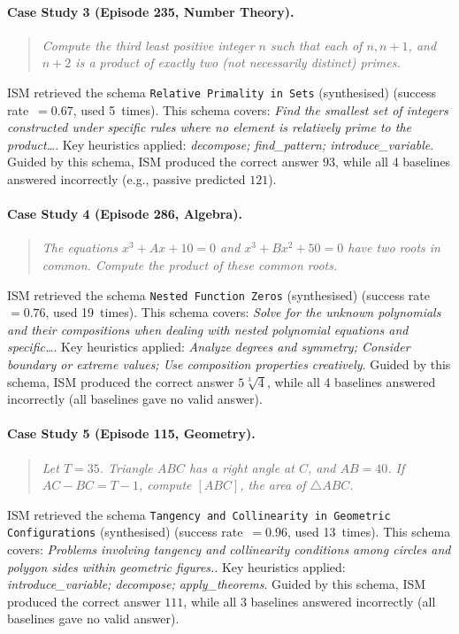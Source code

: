 \paragraph{Case Study 3 (Episode 235, Number Theory).}
\begin{quote}\itshape
Compute the third least positive integer $n$ such that each of $n, n+1$, and $n+2$ is a product of exactly two (not necessarily distinct) primes.
\end{quote}

ISM retrieved the schema \texttt{Relative Primality in Sets} (synthesised) (success rate~$=0.67$, used 5~times). 
This schema covers: \textit{Find the smallest set of integers constructed under specific rules where no element is relatively prime to the product\ldots}. 
Key heuristics applied: \textit{decompose; find_pattern; introduce_variable}. 
Guided by this schema, ISM produced the correct answer $\boxed{93}$, while all 4 baselines answered incorrectly (e.g., passive predicted $121$). 

\paragraph{Case Study 4 (Episode 286, Algebra).}
\begin{quote}\itshape
The equations $x^{3}+A x+10=0$ and $x^{3}+B x^{2}+50=0$ have two roots in common. Compute the product of these common roots.
\end{quote}

ISM retrieved the schema \texttt{Nested Function Zeros} (synthesised) (success rate~$=0.76$, used 19~times). 
This schema covers: \textit{Solve for the unknown polynomials and their compositions when dealing with nested polynomial equations and specific\ldots}. 
Key heuristics applied: \textit{Analyze degrees and symmetry; Consider boundary or extreme values; Use composition properties creatively}. 
Guided by this schema, ISM produced the correct answer $\boxed{5 \sqrt[3]{4}}$, while all 4 baselines answered incorrectly (all baselines gave no valid answer). 

\paragraph{Case Study 5 (Episode 115, Geometry).}
\begin{quote}\itshape
Let $T=35$. Triangle $A B C$ has a right angle at $C$, and $A B=40$. If $A C-B C=T-1$, compute $[A B C]$, the area of $\triangle A B C$.
\end{quote}

ISM retrieved the schema \texttt{Tangency and Collinearity in Geometric Configurations} (synthesised) (success rate~$=0.96$, used 13~times). 
This schema covers: \textit{Problems involving tangency and collinearity conditions among circles and polygon sides within geometric figures.}. 
Key heuristics applied: \textit{introduce_variable; decompose; apply_theorems}. 
Guided by this schema, ISM produced the correct answer $\boxed{111}$, while all 3 baselines answered incorrectly (all baselines gave no valid answer). 
